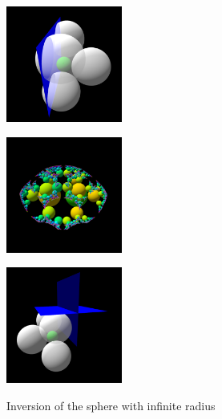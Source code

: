 \begin{figure}[h!tbp]
 \begin{minipage}[]{0.49\hsize}
  \begin{minipage}[]{0.24\hsize}
   \center
   \includegraphics[width=1.5in, height=1.5in, keepaspectratio]{../img/klein/3diis/infSphereGen.pdf}
   \label{fig:infSphereGen}
  \end{minipage}
  \hspace*{\fill}
  \begin{minipage}[]{0.24\hsize}
   \center
   \includegraphics[width=1.5in, height=1.5in, keepaspectratio]{../img/klein/3diis/infSphereOrbit.pdf}
   \label{fig:infSphereOrb}
  \end{minipage}
  \hspace*{\fill}
  \caption{Inversion of the sphere with infinite radius}
  \label{fig:infSphere}
 \end{minipage}
 \begin{minipage}[]{0.49\hsize}
  \begin{minipage}[]{0.24\hsize}
   \center
   \includegraphics[width=1.5in, height=1.5in, keepaspectratio]{../img/klein/3diis/rotationGen.pdf}
   \label{fig:rotationGen}
  \end{minipage}
  \hspace*{\fill}

\end{minipage}
\end{figure}

